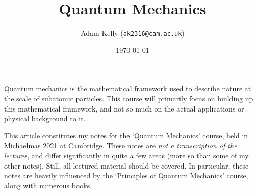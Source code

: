 \documentclass[a4paper]{article}
\title{Quantum Mechanics}
\author{Adam Kelly (\texttt{ak2316@cam.ac.uk})}
\date{\today}
\begin{document}
\maketitle


Quantum mechanics is the mathematical framework used to describe nature at the scale of subatomic particles. This course will primarily focus on building up this mathematical framework, and not so much on the actual applications or physical background to it.


This article constitutes my notes for the `Quantum Mechanics' course, held in Michaelmas 2021 at Cambridge. These notes are \emph{not a transcription of the lectures}, and differ significantly in quite a few areas (more so than some of my other notes). Still, all lectured material should be covered.
In particular, these notes are heavily influenced by the `Principles of Quantum Mechanics' course, along with numerous books.



\tableofcontents



\end{document}
